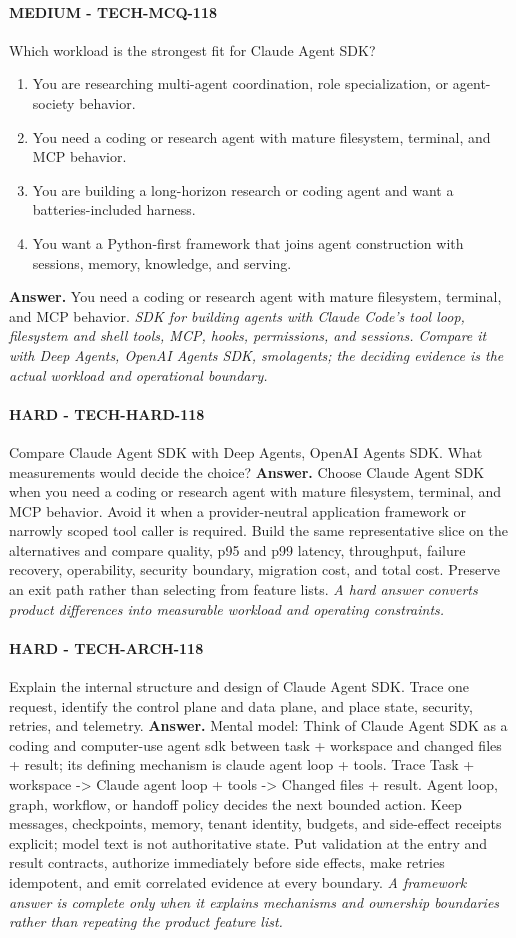 \paragraph{MEDIUM - TECH-MCQ-118} Which workload is the strongest fit for Claude Agent SDK?
\begin{enumerate}[label=\Alph*.]
\item You are researching multi-agent coordination, role specialization, or agent-society behavior.
\item You need a coding or research agent with mature filesystem, terminal, and MCP behavior.
\item You are building a long-horizon research or coding agent and want a batteries-included harness.
\item You want a Python-first framework that joins agent construction with sessions, memory, knowledge, and serving.
\end{enumerate}
\textbf{Answer.} You need a coding or research agent with mature filesystem, terminal, and MCP behavior.
\textit{SDK for building agents with Claude Code's tool loop, filesystem and shell tools, MCP, hooks, permissions, and sessions. Compare it with Deep Agents, OpenAI Agents SDK, smolagents; the deciding evidence is the actual workload and operational boundary.}
\paragraph{HARD - TECH-HARD-118} Compare Claude Agent SDK with Deep Agents, OpenAI Agents SDK. What measurements would decide the choice?
\textbf{Answer.} Choose Claude Agent SDK when you need a coding or research agent with mature filesystem, terminal, and MCP behavior. Avoid it when a provider-neutral application framework or narrowly scoped tool caller is required. Build the same representative slice on the alternatives and compare quality, p95 and p99 latency, throughput, failure recovery, operability, security boundary, migration cost, and total cost. Preserve an exit path rather than selecting from feature lists.
\textit{A hard answer converts product differences into measurable workload and operating constraints.}
\paragraph{HARD - TECH-ARCH-118} Explain the internal structure and design of Claude Agent SDK. Trace one request, identify the control plane and data plane, and place state, security, retries, and telemetry.
\textbf{Answer.} Mental model: Think of Claude Agent SDK as a coding and computer-use agent sdk between task + workspace and changed files + result; its defining mechanism is claude agent loop + tools. Trace Task + workspace -> Claude agent loop + tools -> Changed files + result. Agent loop, graph, workflow, or handoff policy decides the next bounded action. Keep messages, checkpoints, memory, tenant identity, budgets, and side-effect receipts explicit; model text is not authoritative state. Put validation at the entry and result contracts, authorize immediately before side effects, make retries idempotent, and emit correlated evidence at every boundary.
\textit{A framework answer is complete only when it explains mechanisms and ownership boundaries rather than repeating the product feature list.}
